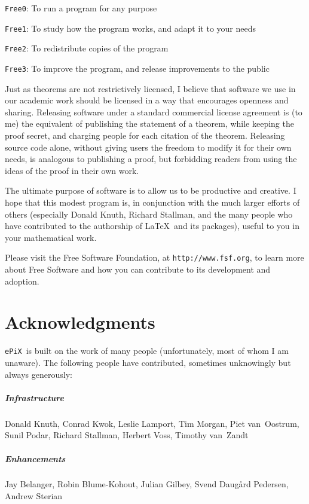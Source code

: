 \documentclass[12pt]{report}
\newcommand{\code}[1]{\texttt{#1}}
\newcommand{\ePiX}{\code{ePiX}}
\begin{document}
\code{Free0}: To run a program for any purpose

\code{Free1}: To study how the program works, and adapt it to your needs

\code{Free2}: To redistribute copies of the program

\code{Free3}: To improve the program, and release improvements to the
public

Just as theorems are not restrictively licensed, I believe that
software we use in our academic work should be licensed in a way that
encourages openness and sharing. Releasing software under a standard
commercial license agreement is (to me) the equivalent of publishing
the statement of a theorem, while keeping the proof secret, and
charging people for each citation of the theorem. Releasing source
code alone, without giving users the freedom to modify it for their
own needs, is analogous to publishing a proof, but forbidding
readers from using the ideas of the proof in their own work.

The ultimate purpose of software is to allow us to be productive and
creative. I hope that this modest program is, in conjunction with the
much larger efforts of others (especially Donald Knuth, Richard
Stallman, and the many people who have contributed to the authorship
of \LaTeX\ and its packages), useful to you in your mathematical work.

Please visit the Free Software Foundation, at
\verb+http://www.fsf.org+, to learn more about Free Software and how
you can contribute to its development and adoption.

\chapter{Acknowledgments}

\ePiX\ is built on the work of many people (unfortunately, most of
whom I am unaware). The following people have contributed, sometimes
unknowingly but always generously: 

\paragraph{Infrastructure} Donald Knuth, Conrad Kwok, Leslie Lamport,
Tim Morgan, Piet van~Oostrum, Sunil Podar, Richard Stallman, Herbert
Voss, Timothy van~Zandt

\paragraph{Enhancements} Jay Belanger, Robin Blume-Kohout, Julian
Gilbey, Svend Daug{\aa}rd Pedersen, Andrew Sterian
\end{document}
